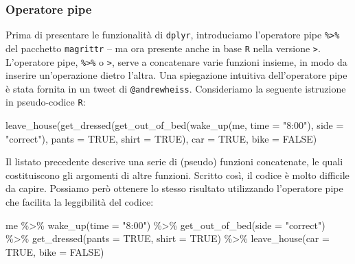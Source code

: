 \documentclass[
  10pt,
  italian,
  a4paper,
  extrafontsizes,onecolumn,openright
  ]{memoir}
\newenvironment{Shaded}{\begin{snugshade}}{\end{snugshade}}
\newcommand{\AttributeTok}[1]{\textcolor[rgb]{0.77,0.63,0.00}{#1}}
\newcommand{\ConstantTok}[1]{\textcolor[rgb]{0.00,0.00,0.00}{#1}}
\newcommand{\FunctionTok}[1]{\textcolor[rgb]{0.00,0.00,0.00}{#1}}
\newcommand{\NormalTok}[1]{#1}
\newcommand{\SpecialCharTok}[1]{\textcolor[rgb]{0.00,0.00,0.00}{#1}}
\newcommand{\StringTok}[1]{\textcolor[rgb]{0.31,0.60,0.02}{#1}}
\begin{document}
\hypertarget{operatore-pipe}{%
\subsubsection{Operatore pipe}\label{operatore-pipe}}

Prima di presentare le funzionalità di \texttt{dplyr}, introduciamo l'operatore pipe \texttt{\%\textgreater{}\%} del pacchetto \texttt{magrittr} -- ma ora presente anche in base \texttt{R} nella versione \texttt{\textbar{}\textgreater{}}. L'operatore pipe, \texttt{\%\textgreater{}\%} o \texttt{\textbar{}\textgreater{}}, serve a concatenare varie funzioni insieme, in modo da inserire un'operazione dietro l'altra. Una spiegazione intuitiva dell'operatore pipe è stata fornita in un tweet di \texttt{@andrewheiss}. Consideriamo la seguente istruzione in pseudo-codice \texttt{R}:

\begin{Shaded}
\begin{Highlighting}[]
\FunctionTok{leave\_house}\NormalTok{(}\FunctionTok{get\_dressed}\NormalTok{(}\FunctionTok{get\_out\_of\_bed}\NormalTok{(}\FunctionTok{wake\_up}\NormalTok{(me, }\AttributeTok{time =} \StringTok{"8:00"}\NormalTok{), }\AttributeTok{side =} \StringTok{"correct"}\NormalTok{), }
\AttributeTok{pants =} \ConstantTok{TRUE}\NormalTok{, }\AttributeTok{shirt =} \ConstantTok{TRUE}\NormalTok{), }\AttributeTok{car =} \ConstantTok{TRUE}\NormalTok{, }\AttributeTok{bike =} \ConstantTok{FALSE}\NormalTok{)}
\end{Highlighting}
\end{Shaded}

Il listato precedente descrive una serie di (pseudo) funzioni concatenate, le quali costituiscono gli argomenti di altre funzioni. Scritto così, il codice è molto difficile da capire. Possiamo però ottenere lo stesso risultato utilizzando l'operatore pipe che facilita la leggibilità del codice:

\begin{Shaded}
\begin{Highlighting}[]
\NormalTok{me }\SpecialCharTok{\%\textgreater{}\%} 
  \FunctionTok{wake\_up}\NormalTok{(}\AttributeTok{time =} \StringTok{"8:00"}\NormalTok{) }\SpecialCharTok{\%\textgreater{}\%} 
  \FunctionTok{get\_out\_of\_bed}\NormalTok{(}\AttributeTok{side =} \StringTok{"correct"}\NormalTok{) }\SpecialCharTok{\%\textgreater{}\%} 
  \FunctionTok{get\_dressed}\NormalTok{(}\AttributeTok{pants =} \ConstantTok{TRUE}\NormalTok{, }\AttributeTok{shirt =} \ConstantTok{TRUE}\NormalTok{) }\SpecialCharTok{\%\textgreater{}\%} 
  \FunctionTok{leave\_house}\NormalTok{(}\AttributeTok{car =} \ConstantTok{TRUE}\NormalTok{, }\AttributeTok{bike =} \ConstantTok{FALSE}\NormalTok{)}
\end{Highlighting}
\end{Shaded}
\end{document}
